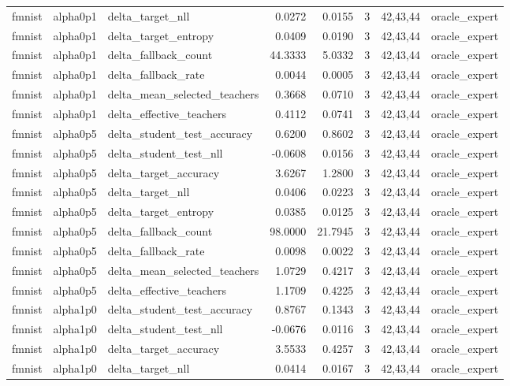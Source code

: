 \begin{tabular}{lllrrrll}
fmnist & alpha0p1 & delta\_target\_nll & 0.0272 & 0.0155 & 3 & 42,43,44 & oracle\_expert \\
fmnist & alpha0p1 & delta\_target\_entropy & 0.0409 & 0.0190 & 3 & 42,43,44 & oracle\_expert \\
fmnist & alpha0p1 & delta\_fallback\_count & 44.3333 & 5.0332 & 3 & 42,43,44 & oracle\_expert \\
fmnist & alpha0p1 & delta\_fallback\_rate & 0.0044 & 0.0005 & 3 & 42,43,44 & oracle\_expert \\
fmnist & alpha0p1 & delta\_mean\_selected\_teachers & 0.3668 & 0.0710 & 3 & 42,43,44 & oracle\_expert \\
fmnist & alpha0p1 & delta\_effective\_teachers & 0.4112 & 0.0741 & 3 & 42,43,44 & oracle\_expert \\
fmnist & alpha0p5 & delta\_student\_test\_accuracy & 0.6200 & 0.8602 & 3 & 42,43,44 & oracle\_expert \\
fmnist & alpha0p5 & delta\_student\_test\_nll & -0.0608 & 0.0156 & 3 & 42,43,44 & oracle\_expert \\
fmnist & alpha0p5 & delta\_target\_accuracy & 3.6267 & 1.2800 & 3 & 42,43,44 & oracle\_expert \\
fmnist & alpha0p5 & delta\_target\_nll & 0.0406 & 0.0223 & 3 & 42,43,44 & oracle\_expert \\
fmnist & alpha0p5 & delta\_target\_entropy & 0.0385 & 0.0125 & 3 & 42,43,44 & oracle\_expert \\
fmnist & alpha0p5 & delta\_fallback\_count & 98.0000 & 21.7945 & 3 & 42,43,44 & oracle\_expert \\
fmnist & alpha0p5 & delta\_fallback\_rate & 0.0098 & 0.0022 & 3 & 42,43,44 & oracle\_expert \\
fmnist & alpha0p5 & delta\_mean\_selected\_teachers & 1.0729 & 0.4217 & 3 & 42,43,44 & oracle\_expert \\
fmnist & alpha0p5 & delta\_effective\_teachers & 1.1709 & 0.4225 & 3 & 42,43,44 & oracle\_expert \\
fmnist & alpha1p0 & delta\_student\_test\_accuracy & 0.8767 & 0.1343 & 3 & 42,43,44 & oracle\_expert \\
fmnist & alpha1p0 & delta\_student\_test\_nll & -0.0676 & 0.0116 & 3 & 42,43,44 & oracle\_expert \\
fmnist & alpha1p0 & delta\_target\_accuracy & 3.5533 & 0.4257 & 3 & 42,43,44 & oracle\_expert \\
fmnist & alpha1p0 & delta\_target\_nll & 0.0414 & 0.0167 & 3 & 42,43,44 & oracle\_expert \\

\end{tabular}
